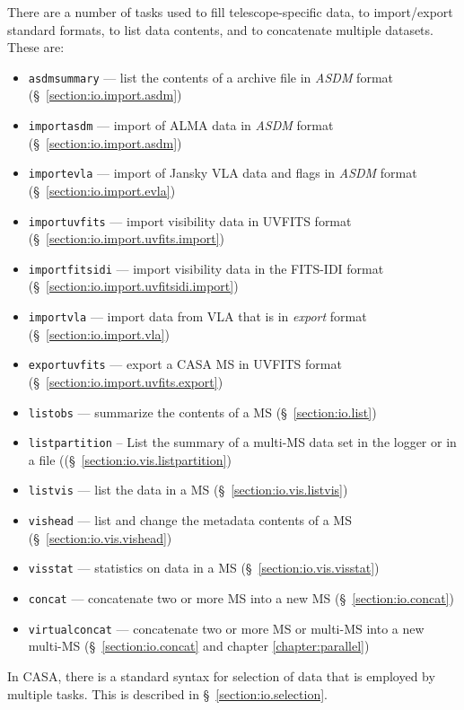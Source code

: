 There are a number of tasks used to fill telescope-specific data,
to import/export standard formats, to list data contents, and
to concatenate multiple datasets.  These are:
\begin{itemize}
   \item {\tt asdmsummary} --- list the contents of a archive file in
     {\it ASDM} format (\S~\ref{section:io.import.asdm})
   \item {\tt importasdm} --- import of ALMA data in 
         {\it ASDM} format (\S~\ref{section:io.import.asdm})
   \item {\tt importevla} --- import of Jansky VLA data and flags in 
         {\it ASDM} format (\S~\ref{section:io.import.evla})
   \item {\tt importuvfits} --- import visibility data in UVFITS
         format (\S~\ref{section:io.import.uvfits.import})
   \item {\tt importfitsidi} --- import visibility data in the
     FITS-IDI format (\S~\ref{section:io.import.uvfitsidi.import})
   \item {\tt importvla} --- import data from VLA that is in 
         {\it export} format (\S~\ref{section:io.import.vla})
   \item {\tt exportuvfits} --- export a CASA MS in UVFITS format 
         (\S~\ref{section:io.import.uvfits.export})
   \item {\tt listobs} --- summarize the contents of a MS 
         (\S~\ref{section:io.list})
   \item{\tt listpartition} -- List the summary of a multi-MS data set
     in the logger or in a file
         ((\S~\ref{section:io.vis.listpartition})
   \item {\tt listvis} --- list the data in a MS 
         (\S~\ref{section:io.vis.listvis})
   \item {\tt vishead} --- list and change the metadata contents of a MS 
         (\S~\ref{section:io.vis.vishead})
   \item {\tt visstat} --- statistics on data in a MS 
         (\S~\ref{section:io.vis.visstat})
   \item {\tt concat} --- concatenate two or more MS into a
         new MS (\S~\ref{section:io.concat})
   \item {\tt virtualconcat} --- concatenate two or more MS or multi-MS into a
         new multi-MS (\S~\ref{section:io.concat} and chapter \ref{chapter:parallel})
\end{itemize}

In CASA, there is a standard syntax for selection of data that
is employed by multiple tasks.  
This is described in \S~\ref{section:io.selection}.

